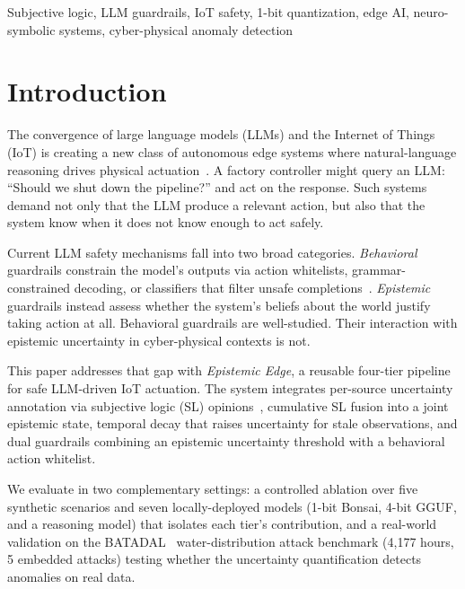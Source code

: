 \documentclass[conference]{IEEEtran}
\begin{document}
\begin{IEEEkeywords}
Subjective logic, LLM guardrails, IoT safety, 1-bit quantization, edge AI, neuro-symbolic systems, cyber-physical anomaly detection
\end{IEEEkeywords}

\section{Introduction}

The convergence of large language models (LLMs) and the Internet of Things (IoT) is creating a new class of autonomous edge systems where natural-language reasoning drives physical actuation~\cite{friha2024llmedge, alwahedi2024iotml}. A factory controller might query an LLM: ``Should we shut down the pipeline?'' and act on the response. Such systems demand not only that the LLM produce a relevant action, but also that the system know when it does not know enough to act safely.

Current LLM safety mechanisms fall into two broad categories. \textit{Behavioral} guardrails constrain the model's outputs via action whitelists, grammar-constrained decoding, or classifiers that filter unsafe completions~\cite{rebedea2023nemo, inan2023llama}. \textit{Epistemic} guardrails instead assess whether the system's beliefs about the world justify taking action at all. Behavioral guardrails are well-studied. Their interaction with epistemic uncertainty in cyber-physical contexts is not.

This paper addresses that gap with \textit{Epistemic Edge}, a reusable four-tier pipeline for safe LLM-driven IoT actuation. The system integrates per-source uncertainty annotation via subjective logic (SL) opinions~\cite{josang2016subjective}, cumulative SL fusion into a joint epistemic state, temporal decay that raises uncertainty for stale observations, and dual guardrails combining an epistemic uncertainty threshold with a behavioral action whitelist.

We evaluate in two complementary settings: a controlled ablation over five synthetic scenarios and seven locally-deployed models (1-bit Bonsai, 4-bit GGUF, and a reasoning model) that isolates each tier's contribution, and a real-world validation on the BATADAL~\cite{taormina2018battle} water-distribution attack benchmark (4{,}177 hours, 5 embedded attacks) testing whether the uncertainty quantification detects anomalies on real data.
\end{document}
